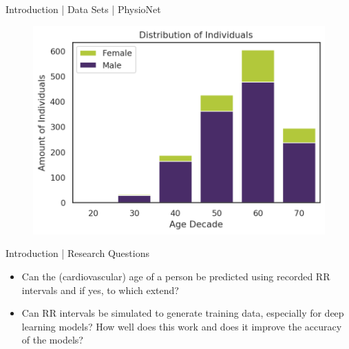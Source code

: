 \documentclass{beamer}
\begin{document}
    \begin{frame}{Introduction | Data Sets | PhysioNet}
        \begin{figure}[hbt]
        	\center
        	\includegraphics[width=1.0\textwidth]{img/physionet-distribution-subjects.png}
        	\label{fig:dist_physionet}
        \end{figure}
    \end{frame}
    
    \begin{frame}{Introduction | Research Questions}
        \begin{itemize}
            \item Can the (cardiovascular) age of a person be predicted using recorded RR intervals and if yes, to which extend?
            \item Can RR intervals be simulated to generate training data, especially for deep learning models? How well does this work and does it improve the accuracy of the models?
        \end{itemize}
    \end{frame}
    
\end{document}
